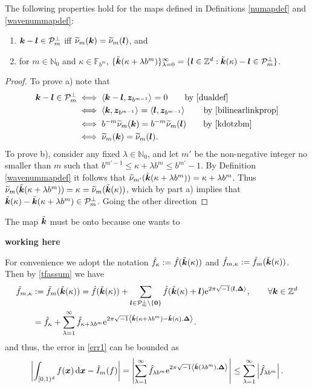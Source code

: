 \documentclass[graybox]{svmult}
\newcommand{\Z}{\mathbb{Z}} %
\newcommand{\N}{\mathbb{N}} %
\newcommand{\F}{\mathbb{F}} %
\newcommand{\bszero}{\boldsymbol{0}} %
\newcommand{\bsx}{\boldsymbol{x}}    %
\newcommand{\bsz}{\boldsymbol{z}}    %
\newcommand{\bsDelta}{\boldsymbol{\Delta}}    %
\begin{document}
\begin{lemma} \label{tvklemma}
The following properties hold for the maps defined in Definitions \ref{numapdef} and \ref{wavenummapdef}:
\begin{enumerate}
\renewcommand{\labelenumi}{\alph{enumi})}
\item $\boldsymbol{k}-\boldsymbol{l} \in \mathcal{P}_m^{\perp}$ iff $\widetilde{\nu}_m(\boldsymbol{k})=\widetilde{\nu}_m(\boldsymbol{l})$, and 
\item for $m \in \N_0$ and $\kappa \in \F_{b^m}$, $\{\tvk(\kappa + \lambda b^m)\}_{\lambda=0}^{\infty} =\{\bsl \in \Z^d : \tvk(\kappa) - \bsl \in \cp_m^{\perp} \}$.
\end{enumerate}
\end{lemma}
\begin{proof} To prove a) note that 
\begin{align*}
\bsk-\bsl \in \cp_m^{\perp} & \iff \ip{\bsk-\bsl}{\bsz_{b^{m-1}}}=0 \qquad \text{by \eqref{dualdef}} \\
& \iff \ip{\bsk}{\bsz_{b^{m-1}}}=\ip{\bsl}{\bsz_{b^{m-1}}} \qquad \text{by \eqref{bilinearlinkprop}}\\
& \iff b^{-m}\tnu_m(\bsk) =b^{-m}\tnu_m(\bsl) \qquad \text{by \eqref{kdotzbm}} \\
& \iff \tnu_m(\bsk) =\tnu_m(\bsl).
\end{align*}
To prove b), consider any fixed $\lambda \in \N_0$,  and let $m'$ be the non-negative integer no smaller than $m$ such that $b^{m'-1} \le \kappa + \lambda b^m \le b^{m'}-1$. By Definition  \ref{wavenummapdef} it follows that $\widetilde{\nu}_{m'}(\tilde{\boldsymbol{k}}(\kappa + \lambda b^m))=\kappa + \lambda b^m$.  Thus $\widetilde{\nu}_{m}(\tilde{\boldsymbol{k}}(\kappa + \lambda b^m))=\kappa=\widetilde{\nu}_{m}(\tilde{\boldsymbol{k}}(\kappa))$, which by part a) implies that $\tilde{\boldsymbol{k}}(\kappa)-\tilde{\boldsymbol{k}}(\kappa + \lambda b^m) \in \mathcal{P}_m^{\perp}$.  Going the other direction

\end{proof}
The map $\tilde{\boldsymbol{k}}$ must be onto because one wants to 

{\bf working here}

For convenience we adopt the notation $\hat{f}_{\kappa} :=\hat{f}(\tilde{\boldsymbol{k}}(\kappa))$ and $\tilde{f}_{m,\kappa} := \tilde{f}_m(\tilde{\boldsymbol{k}}(\kappa))$. Then by \eqref{tfassum} we have
\begin{align}
\nonumber
\tf_{m,\kappa} &:= \tf_m(\tvk(\kappa)) 
= \hf(\tvk(\kappa)) + \sum_{\bsl \in \cp^{\perp}_m\setminus \{\bszero\}} \hf(\tvk(\kappa)+\bsl) \E^{2 \pi \sqrt{-1} \ip{\bsl }{\bsDelta}}, \qquad \forall \bsk \in \Z^d \\
&=\hf_{\kappa} + \sum_{\lambda=1}^{\infty} \hf_{\kappa+\lambda b^{m}} \E^{2 \pi \sqrt{-1} \ip{\tvk(\kappa+\lambda b^{m}) - \tvk(\kappa)}{\bsDelta}}.
\end{align}
and thus, the error in \eqref{err1} can be bounded as
\begin{equation}
\biggabs{ \int_{\cube} f(\bsx) \, \D \bsx - \hI_m(f)} 
= \Biggabs {\sum_{\lambda=1}^{\infty} \hf_{\lambda b^m} \E^{2 \pi \sqrt{-1} \ip{\tvk(\lambda b^m)}{\bsDelta}}}
\le \sum_{\lambda=1}^{\infty} \left \lvert \hf_{\lambda b^m}\right \rvert. \label{err2}
\end{equation}
\end{document}
